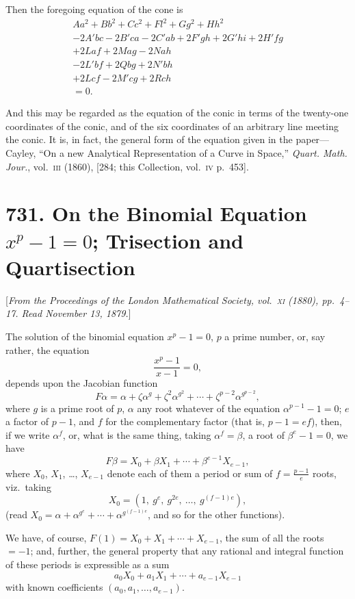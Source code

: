 \documentclass[11pt,a4paper]{book}
\begin{document}
Then the foregoing equation of the cone is
\begin{multline*}
Aa^2+Bb^2+Cc^2+Fl^2+Gg^2+Hh^2\\
-2A'bc-2B'ca-2C'ab+2F'gh+2G'hi+2H'fg\\
+2Laf+2Mag-2Nah\\
-2L'bf+2Qbg+2N'bh\\
+2Lcf-2M'cg+2Rch\\
=0.
\end{multline*}

And this may be regarded as the equation of the conic in terms of the
twenty-one coordinates of the conic, and of the six coordinates of an
arbitrary line meeting the conic. It is, in fact, the general form of the
equation given in the paper---Cayley, ``On a new Analytical Representation
of a Curve in Space,'' \textit{Quart. Math. Jour.}, vol.~\textsc{iii} (1860),
[284; this Collection, vol.~\textsc{iv} p.~453].

\newpage
\section*{731. On the Binomial Equation $x^p-1=0$; Trisection and Quartisection}

[\textit{From the Proceedings of the London Mathematical Society, vol.~\textsc{xi} (1880), pp.~4--17.
Read November 13, 1879.}]

The solution of the binomial equation $x^p-1=0$, $p$ a prime number,
or, say rather, the equation
\[
\frac{x^p-1}{x-1}=0,
\]
depends upon the Jacobian function
\[
F\alpha = \alpha + \zeta\alpha^g + \zeta^2\alpha^{g^2} + \cdots + \zeta^{p-2}\alpha^{g^{p-2}},
\]
where $g$ is a prime root of $p$, $\alpha$ any root whatever of the equation
$\alpha^{p-1}-1=0$; $e$ a factor of $p-1$, and $f$ for the complementary factor
(that is, $p-1=ef$), then, if we write $\alpha^f$, or, what is the same thing,
taking $\alpha^f=\beta$, a root of $\beta^e-1=0$, we have
\[
F\beta = X_0 + \beta X_1 + \cdots + \beta^{e-1}X_{e-1},
\]
where $X_0$, $X_1$, \dots, $X_{e-1}$ denote each of them a period or sum of
$f=\frac{p-1}{e}$ roots, viz.~taking
\[
X_0 = (1,\ g^e,\ g^{2e},\ \ldots,\ g^{(f-1)e}),
\]
(read $X_0 = \alpha+\alpha^{g^e}+\cdots+\alpha^{g^{(f-1)e}}$, and so for the other functions).

We have, of course, $F(1)=X_0+X_1+\cdots+X_{e-1}$, the sum of all
the roots $=-1$; and, further, the general property that any rational
and integral function of these periods is expressible as a sum
\[
a_0X_0 + a_1X_1 + \cdots + a_{e-1}X_{e-1}
\]
with known coefficients $(a_0, a_1, \ldots, a_{e-1})$.
\end{document}
